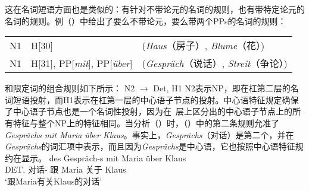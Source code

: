 这在名词短语方面也是类似的：有针对不带论元的名词的规则，也有带特定论元的名词的规则。例（）中给出了要么不带论元，要么带两个PPs的名词的规则\citep*[]{GKPS85a}：
\ea
\begin{tabular}[t]{@{}l@{~$\to$~}ll@{}}
N1 & H[30] & (\emph{Haus}（房子）, \emph{Blume}（花）)\\
N1 & H[31], PP[\emph{mit}], PP[\emph{über}] & (\emph{Gespräch}（说话）, \emph{Streit}（争论）)\\
\end{tabular}
\z
\nbar 和限定词的组合规则如下所示：
\ea
N2 $\to$ Det, H1
\z
N2表示NP，即在杠第二层的名词短语投射，而H1表示在杠第一层的中心语子节点的投射。中心语特征规定确保了中心语子节点也是一个名词性投射，因为在\xbar~层上区分出的中心语子节点上的所有特征与整个NP上的特征相同。当分析（）时，（）中的第二条规则允准了\nbar \emph{Gesprächs mit Maria über Klaus}。事实上，\emph{Gesprächs}（对话）是第二个，并在\emph{Gesprächs}的词汇项中表示，而且因为\emph{Gesprächs}是中心语，它也按照中心语特征规约在\nbar 显示。
\ea
\gll des Gespräch-s mit Maria über Klaus\\
	 DET.\gen{} 对话-\gen{} 跟 Maria 关于 Klaus\\
\glt `跟Maria有关Klaus的对话'
